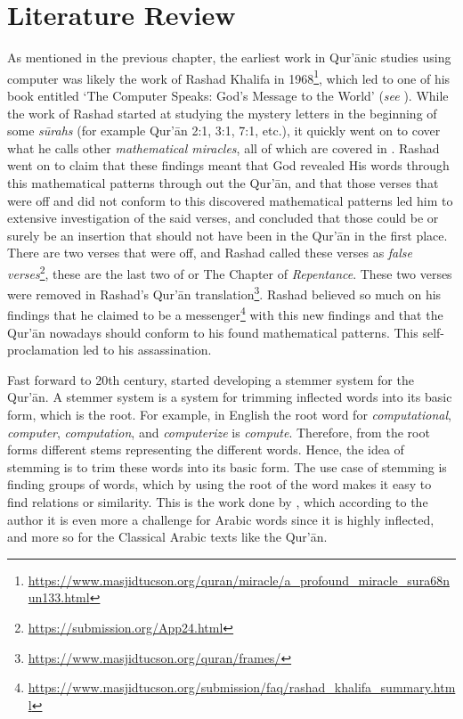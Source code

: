 \chapter{Literature Review}

As mentioned in the previous chapter, the earliest work in Qur'\=anic studies using computer was likely the work of Rashad Khalifa in 1968\footnote{\url{https://www.masjidtucson.org/quran/miracle/a_profound_miracle_sura68nun133.html}}, which led to one of his book entitled `The Computer Speaks: God's Message to the World' (\textit{see} ). While the work of Rashad started at studying the mystery letters in the beginning of some \textit{s\=urahs}  (for example Qur'\=an 2:1, 3:1, 7:1, etc.), it quickly went on to cover what he calls other \textit{mathematical miracles}, all of which are covered in . Rashad went on to claim that these findings meant that God revealed His words through this mathematical patterns through out the Qur'\=an, and that those verses that were off and did not conform to this discovered mathematical patterns led him to extensive investigation of the said verses, and concluded that those could be or surely be an insertion that should not have been in the Qur'\=an in the first place. There are two verses that were off, and Rashad called these verses as \textit{false verses}\footnote{\url{https://submission.org/App24.html}}, these are the last two   of   or The Chapter of \textit{Repentance}. These two verses were removed in Rashad's Qur'\=an translation\footnote{\url{https://www.masjidtucson.org/quran/frames/}}. Rashad believed so much on his findings that he claimed to be a messenger\footnote{\url{https://www.masjidtucson.org/submission/faq/rashad_khalifa_summary.html}} with this new findings and that the Qur'\=an nowadays should conform to his found mathematical patterns. This self-proclamation led to his assassination.

Fast forward to 20th century,  started developing a stemmer system for the Qur'\=an. A stemmer system is a system for trimming inflected words into its basic form, which is the root. For example, in English the root word for \textit{computational}, \textit{computer}, \textit{computation}, and \textit{computerize} is \textit{compute}. Therefore, from the root forms different stems representing the different words. Hence, the idea of stemming is to trim these words into its basic form. The use case of stemming is finding groups of words, which by using the root of the word makes it easy to find relations or similarity. This is the work done by , which according to the author it is even more a challenge for Arabic words since it is highly inflected, and more so for the Classical Arabic texts like the Qur'\=an. 

